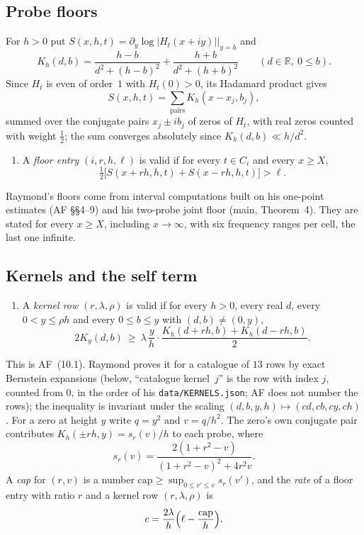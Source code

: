 \documentclass[11pt]{article}
\theoremstyle{definition}
\newcommand{\R}{\mathbb{R}}
\newcommand{\capo}{\mathrm{cap}}
\begin{document}
\subsection{Probe floors}

For $h>0$ put $S(x,h,t)=\partial_y\log|H_t(x+iy)|\big|_{y=h}$ and
\[
K_h(d,b)=\frac{h-b}{d^2+(h-b)^2}+\frac{h+b}{d^2+(h+b)^2}\qquad(d\in\R,\ 0\le b).
\]
Since $H_t$ is even of order~$1$ with $H_t(0)>0$, its Hadamard product gives
\begin{equation}\label{eq:probe}
S(x,h,t)=\sum_{\text{pairs}}K_h(x-x_j,b_j),
\end{equation}
summed over the conjugate pairs $x_j\pm ib_j$ of zeros of $H_t$, with real zeros counted
with weight $\frac12$; the sum converges absolutely since $K_h(d,b)\ll h/d^2$.

\begin{enumerate}[leftmargin=3em]
\item[\textbf{(J)}] A \emph{floor entry} $(i,r,h,\ell)$ is valid if for every $t\in C_i$ and
every $x\ge X$,
\[
\tfrac12\bigl[S(x+rh,h,t)+S(x-rh,h,t)\bigr]>\ell .
\]
\end{enumerate}
Raymond's floors come from interval computations built on his one-point estimates (AF
\S\S4--9) and his two-probe joint floor (main, Theorem~4). They are stated for every
$x\ge X$, including $x\to\infty$, with six frequency ranges per cell, the last one
infinite.

\subsection{Kernels and the self term}

\begin{enumerate}[leftmargin=3em]
\item[\textbf{(K)}] A \emph{kernel row} $(r,\lambda,\rho)$ is valid if for every $h>0$, every
real $d$, every $0<y\le\rho h$ and every $0\le b\le y$ with $(d,b)\ne(0,y)$,
\[
2K_y(d,b)\ \ge\ \lambda\,\frac yh\cdot\frac{K_h(d+rh,b)+K_h(d-rh,b)}2 .
\]
\end{enumerate}
This is AF~(10.1). Raymond proves it for a catalogue of $13$ rows by exact Bernstein
expansions (below, ``catalogue kernel~$j$'' is the row with index $j$, counted from $0$, in
the order of his \texttt{data/KERNELS.json}; AF does not number the rows); the inequality is invariant under the scaling $(d,b,y,h)\mapsto(cd,cb,cy,ch)$.
For a zero at height $y$ write $q=y^2$ and $v=q/h^2$. The zero's own conjugate pair
contributes $K_h(\pm rh,y)=s_r(v)/h$ to each probe, where
\[
s_r(v)=\frac{2(1+r^2-v)}{(1+r^2-v)^2+4r^2v}.
\]
A \emph{cap} for $(r,v)$ is a number $\capo\ge\sup_{0\le v'\le v}s_r(v')$, and the
\emph{rate} of a floor entry with ratio $r$ and a kernel row $(r,\lambda,\rho)$ is
\[
c=\frac{2\lambda}h\Bigl(\ell-\frac{\capo}h\Bigr).
\]
\end{document}
